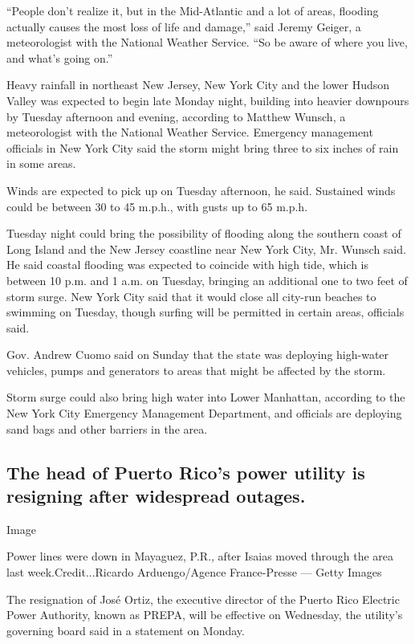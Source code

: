 ``People don't realize it, but in the Mid-Atlantic and a lot of areas,
flooding actually causes the most loss of life and damage,'' said Jeremy
Geiger, a meteorologist with the National Weather Service. ``So be aware
of where you live, and what's going on.''

Heavy rainfall in northeast New Jersey, New York City and the lower
Hudson Valley was expected to begin late Monday night, building into
heavier downpours by Tuesday afternoon and evening, according to Matthew
Wunsch, a meteorologist with the National Weather Service. Emergency
management officials in New York City said the storm might bring three
to six inches of rain in some areas.

Winds are expected to pick up on Tuesday afternoon, he said. Sustained
winds could be between 30 to 45 m.p.h., with gusts up to 65 m.p.h.

Tuesday night could bring the possibility of flooding along the southern
coast of Long Island and the New Jersey coastline near New York City,
Mr. Wunsch said. He said coastal flooding was expected to coincide with
high tide, which is between 10 p.m. and 1 a.m. on Tuesday, bringing an
additional one to two feet of storm surge. New York City said that it
would close all city-run beaches to swimming on Tuesday, though surfing
will be permitted in certain areas, officials said.

Gov. Andrew Cuomo said on Sunday that the state was deploying high-water
vehicles, pumps and generators to areas that might be affected by the
storm.

Storm surge could also bring high water into Lower Manhattan, according
to the New York City Emergency Management Department, and officials are
deploying sand bags and other barriers in the area.

\hypertarget{the-head-of-puerto-ricos-power-utility-is-resigning-after-widespread-outages}{%
\subsection{The head of Puerto Rico's power utility is resigning after
widespread
outages.}\label{the-head-of-puerto-ricos-power-utility-is-resigning-after-widespread-outages}}

Image

Power lines were down in Mayaguez, P.R., after Isaias moved through the
area last week.Credit...Ricardo Arduengo/Agence France-Presse --- Getty
Images

The resignation of José Ortiz, the executive director of the Puerto Rico
Electric Power Authority, known as PREPA, will be effective on
Wednesday, the utility's governing board said in a statement on Monday.

